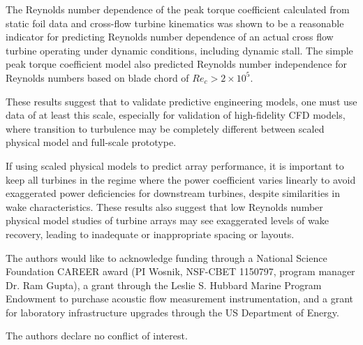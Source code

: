 \documentclass[energies,article,accept,moreauthors,pdftex,12pt,a4paper]{mdpi}
\begin{document}
The Reynolds number dependence of the peak torque coefficient calculated from 
static foil data and cross-flow turbine kinematics was shown to be a reasonable 
indicator for predicting Reynolds number dependence of an actual cross flow 
turbine operating under dynamic conditions, including dynamic stall. The simple 
peak torque coefficient model also predicted Reynolds number independence for  
Reynolds numbers based on blade chord of $Re_c > 2 \times 10^5$. 

These results suggest that to validate predictive engineering models, one must
use data of at least this scale, especially for validation of high-fidelity CFD 
models, where transition to turbulence may be completely different between 
scaled physical model and full-scale prototype.

If using scaled physical models to predict array performance, it is important to
keep all turbines in the regime where the power coefficient varies linearly to 
avoid exaggerated power deficiencies
for downstream turbines, despite similarities in wake characteristics. These
results also suggest that low Reynolds number physical model studies of turbine
arrays may see exaggerated levels of wake recovery, leading to inadequate or
inappropriate spacing or layouts.


The authors would like to acknowledge funding through a National Science
Foundation CAREER award (PI Wosnik, NSF-CBET 1150797, program manager Dr. Ram
Gupta), a grant through the Leslie S. Hubbard Marine Program Endowment to
purchase acoustic flow measurement instrumentation, and a grant for laboratory
infrastructure upgrades through the US Department of Energy.


The authors declare no conflict of interest.




\end{document}
